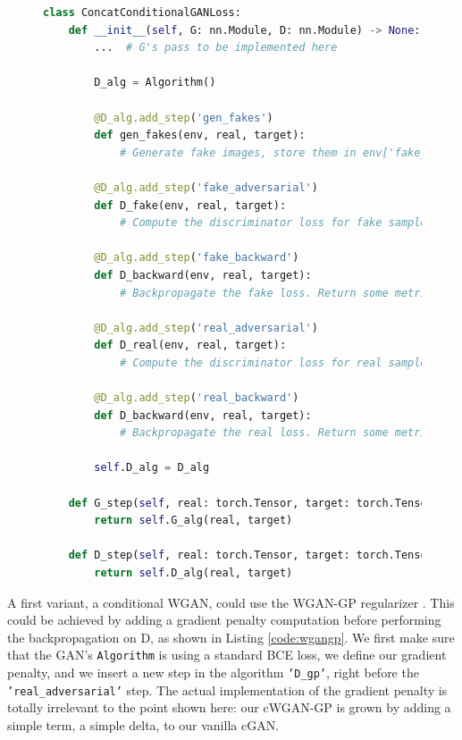 \begin{figure}
\begin{lstlisting}[language=Python, label=code:cgand, caption=The discriminator for a ConcatConditionalGAN. The implementation details are removed in order to focus on the design principles. The generator pass is in Listing \ref{code:cgang}]
class ConcatConditionalGANLoss:
    def __init__(self, G: nn.Module, D: nn.Module) -> None:
        ...  # G's pass to be implemented here
        
        D_alg = Algorithm()

        @D_alg.add_step('gen_fakes')
        def gen_fakes(env, real, target):
            # Generate fake images, store them in env['fake_image']

        @D_alg.add_step('fake_adversarial')
        def D_fake(env, real, target):
            # Compute the discriminator loss for fake samples.
            
        @D_alg.add_step('fake_backward')
        def D_backward(env, real, target):
            # Backpropagate the fake loss. Return some metrics

        @D_alg.add_step('real_adversarial')
        def D_real(env, real, target):
            # Compute the discriminator loss for real samples.
            
        @D_alg.add_step('real_backward')
        def D_backward(env, real, target):
            # Backpropagate the real loss. Return some metrics

        self.D_alg = D_alg

    def G_step(self, real: torch.Tensor, target: torch.Tensor) -> dict:
        return self.G_alg(real, target)

    def D_step(self, real: torch.Tensor, target: torch.Tensor) -> dict:
        return self.D_alg(real, target)
\end{lstlisting}
\end{figure}

A first variant, a conditional WGAN, could use the WGAN-GP regularizer \cite{wgangp}. This could be achieved by adding a gradient penalty computation before performing the backpropagation on D, as shown in Listing \ref{code:wgangp}. We first make sure that the GAN's \texttt{Algorithm} is using a standard \ac{BCE} loss, we define our gradient penalty, and we insert a new step in the algorithm \texttt{'D\_gp'}, right before the \texttt{'real\_adversarial'} step. The actual implementation of the gradient penalty is totally irrelevant to the point shown here: our cWGAN-GP is grown by adding a simple term, a simple delta, to our vanilla cGAN.

